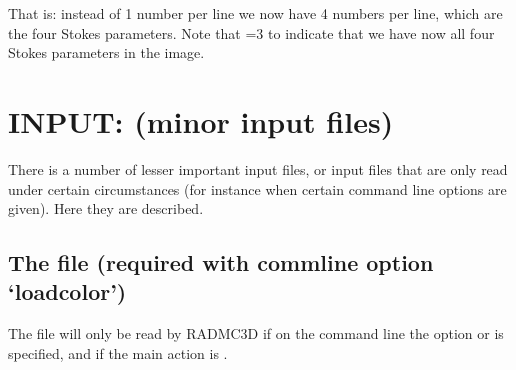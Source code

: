 \documentclass[letterpaper,10pt,english]{sphinxmanual}
\begin{document}
\begin{sphinxVerbatim}[commandchars=\\\{\}]
\PYG{p}{[}\PYG{p}{]}        
\PYG{p}{[}\PYG{p}{]}        
\end{sphinxVerbatim}

That is: instead of 1 number per line we now have 4 numbers per line, which
are the four Stokes parameters. Note that =3 to indicate
that we have now all four Stokes parameters in the image.


\section{INPUT: (minor input files)}
\label{\detokenize{inputoutputfiles:input-minor-input-files}}\label{\detokenize{inputoutputfiles:sec-minor-input-files}}
There is a number of lesser important input files, or input files that are
only read under certain circumstances (for instance when certain command
line options are given). Here they are described.


\subsection{The  file (required with comm\sphinxhyphen{}line option ‘loadcolor’)}
\label{\detokenize{inputoutputfiles:the-color-inus-inp-file-required-with-comm-line-option-loadcolor}}\label{\detokenize{inputoutputfiles:sec-color-inus}}
The file  will only be read by RADMC\sphinxhyphen{}3D if on the command line
the option  or  is specified, and if the main action is
.
\end{document}
